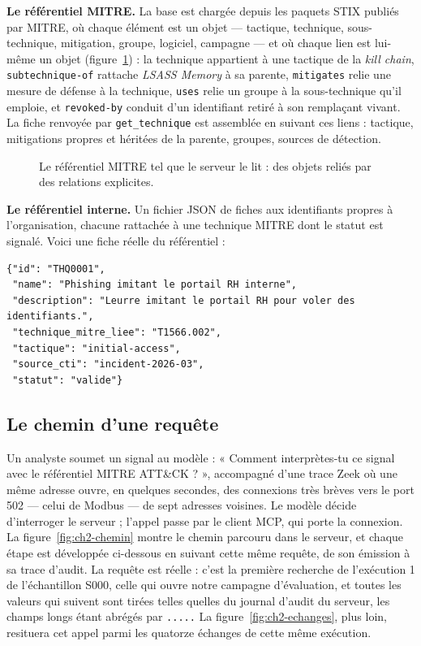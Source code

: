 \textbf{Le référentiel MITRE.} La base est chargée depuis les paquets STIX publiés par MITRE, où chaque élément est un objet --- tactique, technique, sous-technique, mitigation, groupe, logiciel, campagne --- et où chaque lien est lui-même un objet (figure~\ref{fig:ch2-referentiel}) : la technique appartient à une tactique de la \emph{kill chain}, \texttt{subtechnique-of} rattache \emph{LSASS Memory} à sa parente, \texttt{mitigates} relie une mesure de défense à la technique, \texttt{uses} relie un groupe à la sous-technique qu'il emploie, et \texttt{revoked-by} conduit d'un identifiant retiré à son remplaçant vivant. La fiche renvoyée par \texttt{get\_technique} est assemblée en suivant ces liens : tactique, mitigations propres et héritées de la parente, groupes, sources de détection.

\begin{figure}[htbp]
\centering
{}
\caption{Le référentiel MITRE tel que le serveur le lit : des objets reliés par des relations explicites.}\label{fig:ch2-referentiel}
\end{figure}

\textbf{Le référentiel interne.} Un fichier JSON de fiches aux identifiants propres à l'organisation, chacune rattachée à une technique MITRE dont le statut est signalé. Voici une fiche réelle du référentiel :

\begin{verbatim}
{"id": "THQ0001",
 "name": "Phishing imitant le portail RH interne",
 "description": "Leurre imitant le portail RH pour voler des identifiants.",
 "technique_mitre_liee": "T1566.002",
 "tactique": "initial-access",
 "source_cti": "incident-2026-03",
 "statut": "valide"}
\end{verbatim}

\subsection{Le chemin d'une requête}\label{sec:ch2-2-3}

Un analyste soumet un signal au modèle : « Comment interprètes-tu ce signal avec le référentiel MITRE ATT\&CK ? », accompagné d'une trace Zeek où une même adresse ouvre, en quelques secondes, des connexions très brèves vers le port 502 --- celui de Modbus --- de sept adresses voisines. Le modèle décide d'interroger le serveur ; l'appel passe par le client MCP, qui porte la connexion. La figure~\ref{fig:ch2-chemin} montre le chemin parcouru dans le serveur, et chaque étape est développée ci-dessous en suivant cette même requête, de son émission à sa trace d'audit. La requête est réelle : c'est la première recherche de l'exécution 1 de l'échantillon S000, celle qui ouvre notre campagne d'évaluation, et toutes les valeurs qui suivent sont tirées telles quelles du journal d'audit du serveur, les champs longs étant abrégés par \texttt{.....} La figure~\ref{fig:ch2-echanges}, plus loin, resituera cet appel parmi les quatorze échanges de cette même exécution.

